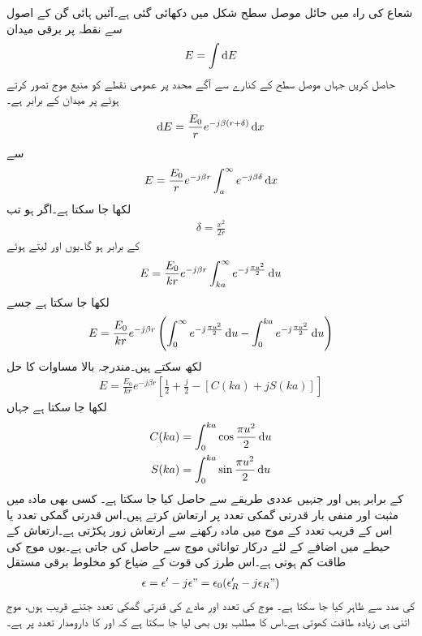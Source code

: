 شعاع کی راہ میں حائل موصل سطح شکل میں دکھائی گئی ہے۔آئیں ہائی گن کے اصول سے نقطہ  پر برقی میدان 
\begin{align}
E=\int \dif E
\end{align}
حاصل کریں جہاں موصل سطح کے کنارے سے آگے  محدد پر عمومی نقطے کو منبع موج تصور کرتے ہوئے  پر میدان  کے برابر ہے۔
\begin{align}
\dif E=\frac{E_0}{r} e^{-j \beta (r+\delta)} \dif x
\end{align}
سے
\begin{align}
E=\frac{E_0}{r} e^{-j \beta r} \int_a^{\infty} e^{-j \beta \delta} \dif x
\end{align}
لکھا جا سکتا ہے۔اگر  ہو تب
\begin{align}
\delta=\frac{x^2}{2r}
\end{align}
کے برابر ہو گا۔یوں  اور  لیتے ہوئے
\begin{align}
E=\frac{E_0}{k r} e^{-j \beta r} \int_{k a}^{\infty} e^{-j \frac{\pi u^2}{2}} \dif u
\end{align}
لکھا جا سکتا ہے جسے
\begin{align}
E=\frac{E_0}{k r} e^{-j \beta r} \left(\int_0^{\infty} e^{-j \frac{\pi u^2}{2}} \dif u-\int_0^{k a} e^{-j \frac{\pi u^2}{2}} \dif u \right)
\end{align}
لکھ سکتے ہیں۔مندرجہ بالا مساوات کا حل
\begin{align}
E=\frac{E_0}{k r} e^{-j \beta r} \left[\frac{1}{2}+\frac{j}{2}-\left[C(ka)+jS(ka)\right]\right]
\end{align}
لکھا جا سکتا ہے جہاں
\begin{align}
C(ka)&=\int_{0}^{k a} \cos \frac{\pi u^2}{2} \dif u\\
S(ka)&=\int_{0}^{k a} \sin \frac{\pi u^2}{2} \dif u 
\end{align}
کے برابر ہیں اور جنہیں عددی طریقے سے حاصل کیا جا سکتا ہے۔
کسی بھی مادہ میں مثبت اور منفی بار قدرتی گمکی تعدد پر ارتعاش کرتے ہیں۔اس قدرتی گمکی تعدد یا اس کے قریب تعدد کے موج میں مادہ رکھنے سے ارتعاش زور پکڑتی ہے۔ارتعاش کے حیطے میں اضافے کے لئے درکار توانائی موج سے حاصل کی جاتی ہے۔یوں موج کی طاقت کم ہوتی ہے۔اس طرز کی قوت کے ضیاع کو مخلوط برقی مستقل
\begin{align}
\epsilon=\epsilon'-j \epsilon"=\epsilon_0(\epsilon_R'-j\epsilon_R")
\end{align}
 کی مدد سے ظاہر کیا جا سکتا ہے۔ موج کی تعدد اور مادے کی قدرتی گمکی تعدد جتنے قریب ہوں، موج اتنی ہی زیادہ طاقت کھوتی ہے۔اس کا مطلب یوں بھی لیا جا سکتا ہے کہ  اور  کا دارومدار تعدد پر ہے۔

